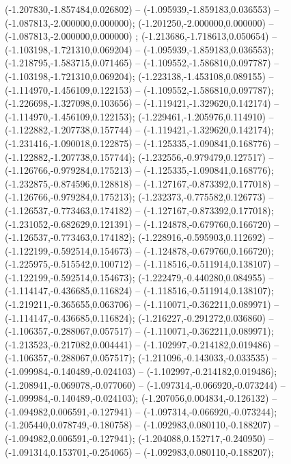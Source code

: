  (-1.207830,-1.857484,0.026802) -- (-1.095939,-1.859183,0.036553) -- (-1.087813,-2.000000,0.000000);
 (-1.201250,-2.000000,0.000000) -- (-1.087813,-2.000000,0.000000) ;
 (-1.213686,-1.718613,0.050654) -- (-1.103198,-1.721310,0.069204) -- (-1.095939,-1.859183,0.036553);
 (-1.218795,-1.583715,0.071465) -- (-1.109552,-1.586810,0.097787) -- (-1.103198,-1.721310,0.069204);
 (-1.223138,-1.453108,0.089155) -- (-1.114970,-1.456109,0.122153) -- (-1.109552,-1.586810,0.097787);
 (-1.226698,-1.327098,0.103656) -- (-1.119421,-1.329620,0.142174) -- (-1.114970,-1.456109,0.122153);
 (-1.229461,-1.205976,0.114910) -- (-1.122882,-1.207738,0.157744) -- (-1.119421,-1.329620,0.142174);
 (-1.231416,-1.090018,0.122875) -- (-1.125335,-1.090841,0.168776) -- (-1.122882,-1.207738,0.157744);
 (-1.232556,-0.979479,0.127517) -- (-1.126766,-0.979284,0.175213) -- (-1.125335,-1.090841,0.168776);
 (-1.232875,-0.874596,0.128818) -- (-1.127167,-0.873392,0.177018) -- (-1.126766,-0.979284,0.175213);
 (-1.232373,-0.775582,0.126773) -- (-1.126537,-0.773463,0.174182) -- (-1.127167,-0.873392,0.177018);
 (-1.231052,-0.682629,0.121391) -- (-1.124878,-0.679760,0.166720) -- (-1.126537,-0.773463,0.174182);
 (-1.228916,-0.595903,0.112692) -- (-1.122199,-0.592514,0.154673) -- (-1.124878,-0.679760,0.166720);
 (-1.225975,-0.515542,0.100712) -- (-1.118516,-0.511914,0.138107) -- (-1.122199,-0.592514,0.154673);
 (-1.222479,-0.440280,0.084955) -- (-1.114147,-0.436685,0.116824) -- (-1.118516,-0.511914,0.138107);
 (-1.219211,-0.365655,0.063706) -- (-1.110071,-0.362211,0.089971) -- (-1.114147,-0.436685,0.116824);
 (-1.216227,-0.291272,0.036860) -- (-1.106357,-0.288067,0.057517) -- (-1.110071,-0.362211,0.089971);
 (-1.213523,-0.217082,0.004441) -- (-1.102997,-0.214182,0.019486) -- (-1.106357,-0.288067,0.057517);
 (-1.211096,-0.143033,-0.033535) -- (-1.099984,-0.140489,-0.024103) -- (-1.102997,-0.214182,0.019486);
 (-1.208941,-0.069078,-0.077060) -- (-1.097314,-0.066920,-0.073244) -- (-1.099984,-0.140489,-0.024103);
 (-1.207056,0.004834,-0.126132) -- (-1.094982,0.006591,-0.127941) -- (-1.097314,-0.066920,-0.073244);
 (-1.205440,0.078749,-0.180758) -- (-1.092983,0.080110,-0.188207) -- (-1.094982,0.006591,-0.127941);
 (-1.204088,0.152717,-0.240950) -- (-1.091314,0.153701,-0.254065) -- (-1.092983,0.080110,-0.188207);
